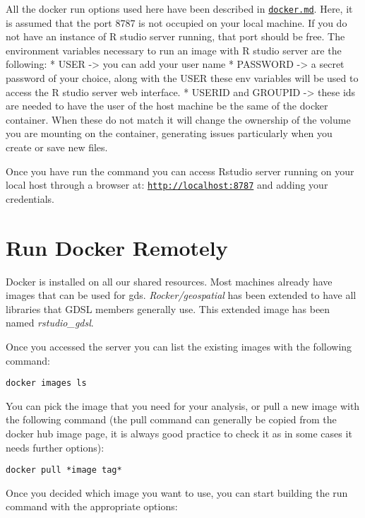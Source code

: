 \documentclass[
]{book}
\begin{document}
All the docker run options used here have been described in \href{06_docker.md}{\texttt{docker.md}}. Here, it is assumed that the port 8787 is not occupied on your local machine. If you do not have an instance of R studio server running, that port should be free.
The environment variables necessary to run an image with R studio server are the following:
* USER -\textgreater{} you can add your user name
* PASSWORD -\textgreater{} a secret password of your choice, along with the USER these env variables will be used to access the R studio server web interface.
* USERID and GROUPID -\textgreater{} these ids are needed to have the user of the host machine be the same of the docker container. When these do not match it will change the ownership of the volume you are mounting on the container, generating issues particularly when you create or save new files.

Once you have run the command you can access Rstudio server running on your local host through a browser at: \href{http://localhost:8787}{\texttt{http://localhost:8787}} and adding your credentials.

\hypertarget{run-docker-remotely}{%
\section{Run Docker Remotely}\label{run-docker-remotely}}

Docker is installed on all our shared resources. Most machines already have images that can be used for gds. \emph{Rocker/geospatial} has been extended to have all libraries that GDSL members generally use. This extended image has been named \emph{rstudio\_gdsl}.

Once you accessed the server you can list the existing images with the following command:

\begin{verbatim}
docker images ls
\end{verbatim}

You can pick the image that you need for your analysis, or pull a new image with the following command (the pull command can generally be copied from the docker hub image page, it is always good practice to check it as in some cases it needs further options):

\begin{verbatim}
docker pull *image tag*
\end{verbatim}

Once you decided which image you want to use, you can start building the run command with the appropriate options:
\end{document}
